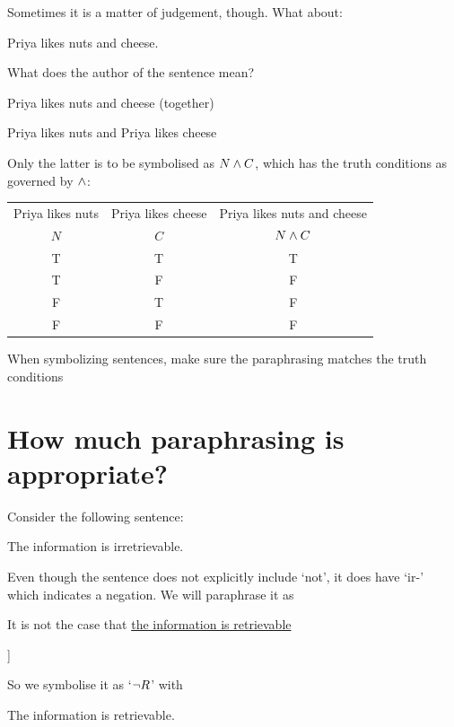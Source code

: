 Sometimes it is a matter of judgement, though. What about:
\begin{samplesent}
	\item Priya likes nuts and cheese.
\end{samplesent}
What does the author of the sentence mean?
\begin{samplesent}
		\item Priya likes nuts and cheese (together)
		\item {Priya likes nuts} and {Priya likes cheese}
\end{samplesent}
Only the latter is to be symbolised as $N\mathbin{\wedge} C$, which has the truth conditions as governed by $\mathbin{\wedge}$:
\begin{center}
	\begin{tabular}{cc|c}
		Priya likes nuts&Priya likes cheese&Priya likes nuts and cheese\\
		$N$&$C$&$N\mathbin{\wedge} C$\Bstrut\\\hline\Tstrut
		T&T&T\\
		T&F&F\\
		F&T&F\\
		F&F&F
	\end{tabular}
\end{center}

\begin{highlighted}When symbolizing sentences, make sure the paraphrasing matches the truth conditions\end{highlighted}

\section{How much paraphrasing is appropriate?}

Consider the following sentence:
\begin{samplesent}
	\item\label{sent:not5} The information is irretrievable.
\end{samplesent}
Even though the sentence does not explicitly include `not', it does have `ir-' which indicates a negation.
We will paraphrase it as \begin{samplesent}
	\item It is not the case that \underline{the information is retrievable}
\end{samplesent}

\begin{center}
	\begin{forest}
		[The information is irretrievable\\It is not the case that \ldots
		[The information is retrievable\\$R$]]
	\end{forest}
\end{center}
So we symbolise it as `$\neg R$' with
\begin{ekey}
	\item[R] The information is retrievable.
\end{ekey}

